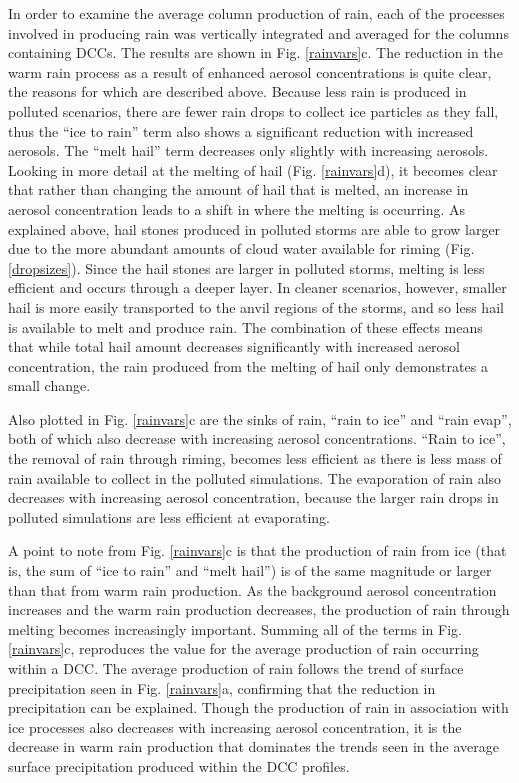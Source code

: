 In order to examine the average column production of rain, each of the processes involved in producing rain was vertically integrated and averaged for the columns containing DCCs.  The results are shown in Fig. \ref{rainvars}c.  The reduction in the warm rain process as a result of enhanced aerosol concentrations is quite clear, the reasons for which are described above.  Because less rain is produced in polluted scenarios, there are fewer rain drops to collect ice particles as they fall, thus the ``ice to rain'' term also shows a significant reduction with increased aerosols.  The ``melt hail'' term decreases only slightly with increasing aerosols.  Looking in more detail at the melting of hail (Fig. \ref{rainvars}d), it becomes clear that rather than changing the amount of hail that is melted, an increase in aerosol concentration leads to a shift in where the melting is occurring.  As explained above, hail stones produced in polluted storms are able to grow larger due to the more abundant amounts of cloud water available for riming (Fig. \ref{dropsizes}).  Since the hail stones are larger in polluted storms, melting is less efficient and occurs through a deeper layer.  In cleaner scenarios, however, smaller hail is more easily transported to the anvil regions of the storms, and so less hail is available to melt and produce rain.  The combination of these effects means that while total hail amount decreases significantly with increased aerosol concentration, the rain produced from the melting of hail only demonstrates a small change.   

Also plotted in Fig. \ref{rainvars}c are the sinks of rain, ``rain to ice'' and ``rain evap'', both of which also decrease with increasing aerosol concentrations.  ``Rain to ice'', the removal of rain through riming, becomes less efficient as there is less mass of rain available to collect in the polluted simulations.  The evaporation of rain also decreases with increasing aerosol concentration, because the larger rain drops in polluted simulations are less efficient at evaporating.

A point to note from Fig. \ref{rainvars}c is that the production of rain from ice (that is, the sum of ``ice to rain'' and ``melt hail'') is of the same magnitude or larger than that from warm rain production.  As the background aerosol concentration increases and the warm rain production decreases, the production of rain through melting becomes increasingly important.  Summing all of the terms in Fig. \ref{rainvars}c, reproduces the value for the average production of rain occurring within a DCC.  The average production of rain follows the trend of surface precipitation seen in Fig. \ref{rainvars}a, confirming that the reduction in precipitation can be explained.  Though the production of rain in association with ice processes also decreases with increasing aerosol concentration, it is the decrease in warm rain production that dominates the trends seen in the average surface precipitation produced within the DCC profiles.




